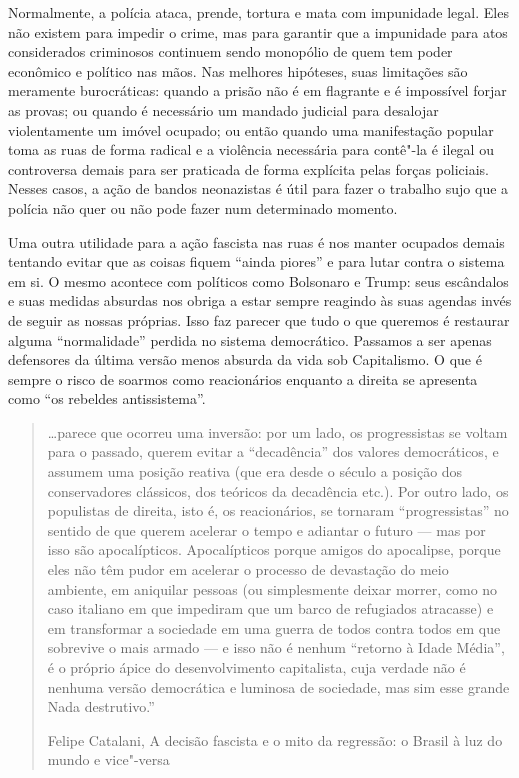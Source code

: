 Normalmente, a polícia ataca, prende, tortura e mata com impunidade legal. Eles não existem para impedir o crime, mas para garantir que a impunidade para atos considerados criminosos continuem sendo monopólio de quem tem poder econômico e político nas mãos. Nas melhores hipóteses, suas limitações são meramente burocráticas: quando a prisão não é em flagrante e é impossível forjar as provas; ou quando é necessário um mandado judicial para desalojar violentamente um imóvel ocupado; ou então quando uma manifestação popular toma as ruas de forma radical e a violência necessária para contê"-la é ilegal ou controversa demais para ser praticada de forma explícita pelas forças policiais. Nesses casos, a ação de bandos neonazistas é útil para fazer o trabalho sujo que a polícia não quer ou não pode fazer num determinado momento.

Uma outra utilidade para a ação fascista nas ruas é nos manter ocupados demais tentando evitar que as coisas fiquem ``ainda piores'' e para lutar contra o sistema em si. O mesmo acontece com políticos como Bolsonaro e Trump: seus escândalos e suas medidas absurdas nos obriga a estar sempre reagindo às suas agendas invés de seguir as nossas próprias. Isso faz parecer que tudo o que queremos é restaurar alguma ``normalidade'' perdida no sistema democrático. Passamos a ser apenas defensores da última versão menos absurda da vida sob Capitalismo. O que é sempre o risco de soarmos como reacionários enquanto a direita se apresenta como ``os rebeldes antissistema''.

\begin{quote}
\ldots{}parece que ocorreu uma inversão: por um lado, os progressistas se voltam para o passado, querem evitar a ``decadência'' dos valores democráticos, e assumem uma posição reativa (que era desde o século  a posição dos conservadores clássicos, dos teóricos da decadência etc.). Por outro lado, os populistas de direita, isto é, os reacionários, se tornaram ``progressistas'' no sentido de que querem acelerar o tempo e adiantar o futuro --- mas por isso são apocalípticos. Apocalípticos porque amigos do apocalipse, porque eles não têm pudor em acelerar o processo de devastação do meio ambiente, em aniquilar pessoas (ou simplesmente deixar morrer, como no caso italiano em que impediram que um barco de refugiados atracasse) e em transformar a sociedade em uma guerra de todos contra todos em que sobrevive o mais armado --- e isso não é nenhum ``retorno à Idade Média'', é o próprio ápice do desenvolvimento capitalista, cuja verdade não é nenhuma versão democrática e luminosa de sociedade, mas sim esse grande Nada destrutivo.''

Felipe Catalani, A decisão fascista e o mito da regressão: o Brasil à luz do mundo e vice"-versa
\end{quote}

